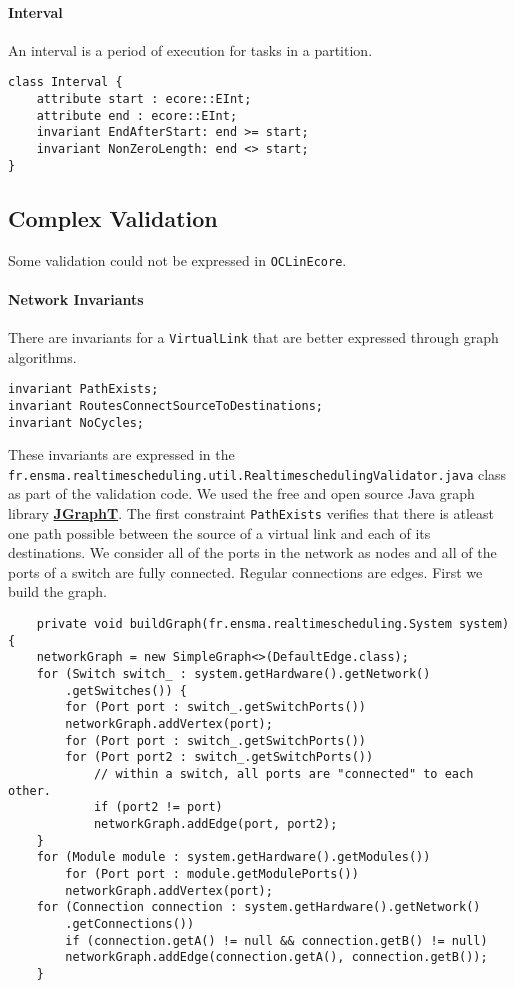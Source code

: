 \paragraph{Interval}
An interval is a period of execution for tasks in a partition.
\begin{lstlisting}[caption=Interval constraints]
class Interval {
    attribute start : ecore::EInt;
    attribute end : ecore::EInt;
    invariant EndAfterStart: end >= start;
    invariant NonZeroLength: end <> start;
}
\end{lstlisting}
\subsection{Complex Validation}
Some validation could not be expressed in \texttt{OCLinEcore}.
\paragraph{Network Invariants} There are invariants for a \texttt{VirtualLink}
that are better expressed through graph algorithms.
\begin{lstlisting}[caption=VirtualLink graph invariants]
invariant PathExists;
invariant RoutesConnectSourceToDestinations;
invariant NoCycles;
\end{lstlisting}
These invariants are expressed in the \texttt{fr.ensma.realtimescheduling.util.RealtimeschedulingValidator.java} class as part of the validation code.
We used the free and open source Java graph library \href{http://jgrapht.org/}{\textbf{JGraphT}}.
The first constraint \texttt{PathExists} verifies that there is atleast one path possible
between the source of a virtual link and each of its destinations. We consider all
of the ports in the network as nodes and all of the ports of a switch are fully connected.
Regular connections are edges.
First we build the graph.
\begin{verbatim}
    private void buildGraph(fr.ensma.realtimescheduling.System system) {
	networkGraph = new SimpleGraph<>(DefaultEdge.class); 
	for (Switch switch_ : system.getHardware().getNetwork()
		.getSwitches()) { 
	    for (Port port : switch_.getSwitchPorts()) 
		networkGraph.addVertex(port);
	    for (Port port : switch_.getSwitchPorts()) 
		for (Port port2 : switch_.getSwitchPorts()) 
		    // within a switch, all ports are "connected" to each other.
		    if (port2 != port) 
			networkGraph.addEdge(port, port2);
	}
	for (Module module : system.getHardware().getModules()) 
	    for (Port port : module.getModulePorts()) 
		networkGraph.addVertex(port);
	for (Connection connection : system.getHardware().getNetwork()
		.getConnections()) 
	    if (connection.getA() != null && connection.getB() != null) 
		networkGraph.addEdge(connection.getA(), connection.getB());
    }
\end{verbatim}
